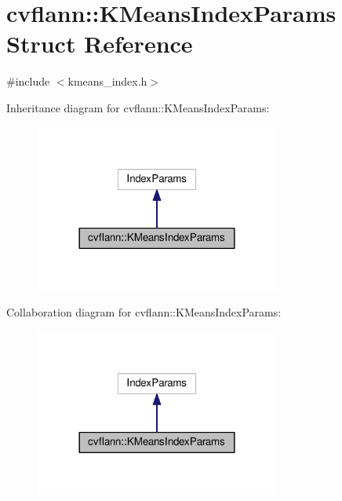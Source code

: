 \hypertarget{structcvflann_1_1KMeansIndexParams}{\section{cvflann\-:\-:K\-Means\-Index\-Params Struct Reference}
\label{structcvflann_1_1KMeansIndexParams}
}


{\ttfamily \#include $<$kmeans\-\_\-index.\-h$>$}



Inheritance diagram for cvflann\-:\-:K\-Means\-Index\-Params\-:\nopagebreak
\begin{figure}[H]
\begin{center}
\leavevmode
\includegraphics[width=228pt]{structcvflann_1_1KMeansIndexParams__inherit__graph}
\end{center}
\end{figure}


Collaboration diagram for cvflann\-:\-:K\-Means\-Index\-Params\-:\nopagebreak
\begin{figure}[H]
\begin{center}
\leavevmode
\includegraphics[width=228pt]{structcvflann_1_1KMeansIndexParams__coll__graph}
\end{center}
\end{figure}
